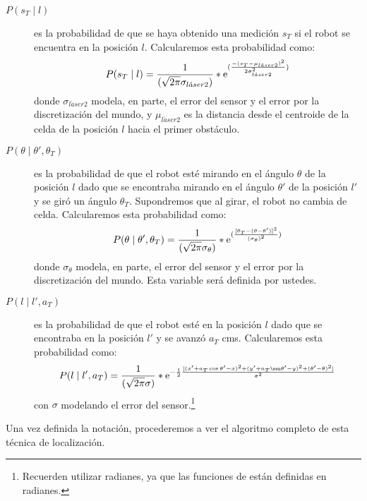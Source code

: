\begin{description}
  \item[$P(s_T \mid l)$] es la probabilidad de que se haya obtenido una medición \(s_T\) si el robot se encuentra en la posición \(l\). Calcularemos esta probabilidad como:
  \begin{align}
    P(s_T \mid l) = {1 \over (\sqrt{2\pi}\sigma_{l\acute{a}ser2})}*\mathrm{e}^{({{-(s_T - \mu_{l\acute{a}ser2})^2} \over {2\sigma_{l\acute{a}ser2}^2}})}
    \label{eq:Pmedicion}
  \end{align}
  donde \(\sigma_{l\acute{a}ser2}\) modela, en parte, el error del sensor y el error por la discretización del mundo, y \(\mu_{l\acute{a}ser2}\) es la distancia desde el centroide de la celda de la posición \(l\) hacia el primer obstáculo.
  \item[$P(\theta \mid \theta', \theta_T)$] es la probabilidad de que el robot esté mirando en el ángulo \(\theta\) de la posición \(l\) dado que se encontraba mirando en el ángulo \(\theta'\) de la posición \(l'\) y se giró un ángulo \(\theta_T\). Supondremos que al girar, el robot no cambia de celda. Calcularemos esta probabilidad como:
  \begin{align}
    P(\theta \mid \theta', \theta_T) = {1 \over (\sqrt{2\pi}\sigma_\theta)}*\mathrm{e}^{({{[\theta_T - (\theta - \theta')]^2} \over {{(\sigma_\theta)}^2}})}
    \label{eq:Podometro}
  \end{align}
  donde \(\sigma_{\theta}\) modela, en parte, el error del sensor y el error por la discretización del mundo. Esta variable será definida por ustedes.
  \item[$P(l \mid l', a_T)$] es la probabilidad de que el robot esté en la posición \(l\) dado que se encontraba en la posición \(l'\) y se avanzó \(a_T\) cms. Calcularemos esta probabilidad como:
  \begin{align}
    P(l \mid l', a_T) = {1 \over (\sqrt{2\pi}\sigma)}*\me^{ -{{1} \over {2}} {{[{ {{ (x' + a_T \cos \theta' - x)^2 } +  { (y' + a_T \sen \theta' - y)^2 } } } + {(\theta' - \theta)^2}]}\over{\sigma^2}}}
    \label{eq:Pgiro}
  \end{align}
  con $\sigma$  modelando el error del sensor.\footnote{Recuerden utilizar radianes, ya que las funciones de  están definidas en radianes.}

\end{description}


Una vez definida la notación, procederemos a ver el algoritmo completo de esta técnica de localización.

